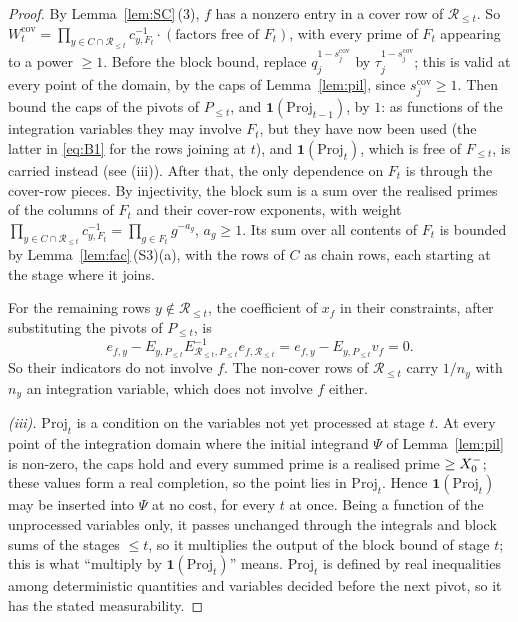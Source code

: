 \begin{proof}
By Lemma~\ref{lem:SC}\,(3), $f$ has a nonzero entry in a cover row of $\mathcal R_{\le t}$. So
$W_t^{\mathrm{cov}}=\prod_{y\in C\cap\mathcal R_{\le t}}c_{y,F_t}^{-1}\cdot(\text{factors free of }F_t)$, with every
prime of $F_t$ appearing to a power $\ge1$. Before the block bound, replace $q_j^{1-s_j^{\mathrm{cov}}}$ by
$\tau_j^{1-s_j^{\mathrm{cov}}}$; this is valid at every point of the domain, by the caps of Lemma~\ref{lem:pil}, since
$s_j^{\mathrm{cov}}\ge1$. Then bound the caps of the pivots of $P_{\le t}$, and $\mathbf 1(\mathrm{Proj}_{t-1})$, by $1$: as
functions of the integration variables they may involve $F_t$, but they have now been used (the latter in \eqref{eq:B1} for the
rows joining at $t$), and $\mathbf 1(\mathrm{Proj}_t)$, which is free of $F_{\le t}$, is carried instead (see (iii)). After that, the only dependence on $F_t$ is through the cover-row pieces. By injectivity, the
block sum is a sum over the realised primes of the columns of $F_t$ and their cover-row exponents, with weight
$\prod_{y\in C\cap\mathcal R_{\le t}}c_{y,F_t}^{-1}=\prod_{g\in F_t}g^{-a_g}$, $a_g\ge1$. Its sum over all contents of
$F_t$ is bounded by Lemma~\ref{lem:fac}\,(S3)(a), with the rows of $C$ as chain rows, each starting at the stage where it
joins.

For the remaining rows $y\notin\mathcal R_{\le t}$, the coefficient of $x_f$ in their constraints, after substituting
the pivots of $P_{\le t}$, is
\[
  e_{f,y}-E_{y,P_{\le t}}E_{\mathcal R_{\le t},P_{\le t}}^{-1}e_{f,\mathcal R_{\le t}}=e_{f,y}-E_{y,P_{\le t}}v_f=0 .
\]
So their indicators do not involve $f$. The non-cover rows of $\mathcal R_{\le t}$ carry $1/n_y$ with $n_y$ an
integration variable, which does not involve $f$ either.

\emph{(iii).} $\mathrm{Proj}_t$ is a condition on the variables not yet processed at stage $t$. At every point of the
integration domain where the initial integrand $\Psi$ of Lemma~\ref{lem:pil} is non-zero, the caps hold and every summed
prime is a realised prime $\ge X_0^{-}$; these values form a real completion, so the point lies in $\mathrm{Proj}_t$. Hence
$\mathbf 1(\mathrm{Proj}_t)$ may be inserted into $\Psi$ at no cost, for every $t$ at once. Being a function of the
unprocessed variables only, it passes unchanged through the integrals and block sums of the stages $\le t$, so it
multiplies the output of the block bound of stage $t$; this is what ``multiply by $\mathbf 1(\mathrm{Proj}_t)$'' means.
$\mathrm{Proj}_t$ is defined by real inequalities among deterministic quantities and variables decided before the next
pivot, so it has the stated measurability.


\end{proof}
